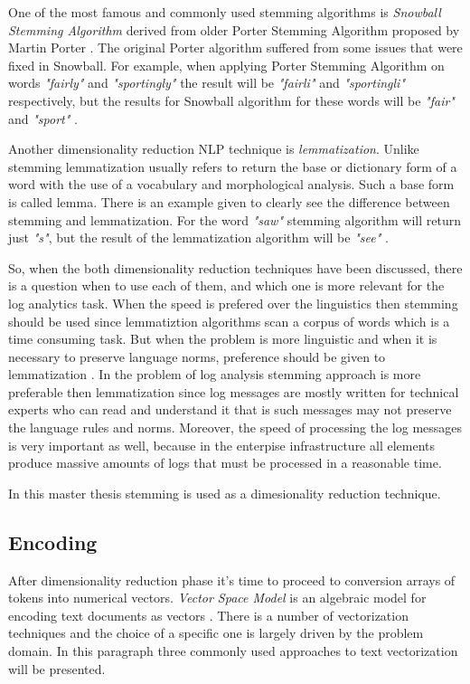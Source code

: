 \documentclass[thesis=M,english]{FITthesis}[2019/12/23]
\begin{document}
One of the most famous and commonly used stemming algorithms is \textit{Snowball Stemming Algorithm} derived from older Porter Stemming Algorithm proposed by Martin Porter \cite{porter-stemming-alg}. The original Porter algorithm suffered from some issues that were fixed in Snowball. For example, when applying Porter Stemming Algorithm on words \textit{"fairly"} and \textit{"sportingly"} the result will be \textit{"fairli"} and \textit{"sportingli"} respectively, but the results for Snowball algorithm for these words will be \textit{"fair"} and \textit{"sport"} \cite{snowball-porter-difference}. 

Another dimensionality reduction NLP technique is \textit{lemmatization}.  
Unlike stemming lemmatization usually refers to return the base or dictionary form of a word with the use of a vocabulary and morphological analysis. Such a base form is called lemma. There is an example given to clearly see the difference between stemming and lemmatization. For the word \textit{"saw"} stemming algorithm will return just \textit{"s"}, but the result of the lemmatization algorithm will be \textit{"see"} \cite{stemming-and-lemmatization}.

So, when the both dimensionality reduction techniques have been discussed, there is a question when to use each of them, and which one is more relevant for the log analytics task. When the speed is prefered over the linguistics then stemming should be used since lemmatiztion algorithms scan a corpus of words which is a time consuming task. But when the problem is more linguistic and when it is necessary to preserve language norms, preference should be given to lemmatization \cite{stemming-or-lemmatization}. In the problem of log analysis stemming approach is more preferable then lemmatization since log messages are mostly written for technical experts who can read and understand it that is such messages may not preserve the language rules and norms. Moreover, the speed of processing the log messages is very important as well, because in the enterpise infrastructure all elements produce massive amounts of logs that must be processed in a reasonable time. 

In this master thesis stemming is used as a dimesionality reduction technique.

\subsection{Encoding}
After dimensionality reduction phase it's time to proceed to conversion arrays of tokens into numerical vectors. \textit{Vector Space Model} is an algebraic model for encoding text documents as vectors \cite{vsm-wiki-def}. There is a number of vectorization techniques and the choice of a specific one is largely driven by the problem domain. In this paragraph three commonly used approaches to text vectorization will be presented.
\end{document}
